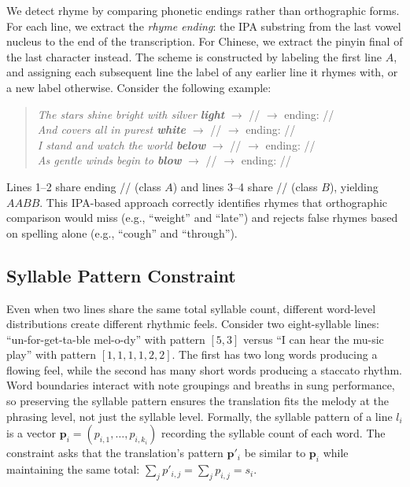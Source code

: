 \documentclass[11pt]{article}
\begin{document}
We detect rhyme by comparing phonetic endings rather than orthographic forms.
For each line, we extract the \emph{rhyme ending}: the IPA substring from the last vowel nucleus to the end of the transcription.
For Chinese, we extract the pinyin final of the last character instead.
The scheme is constructed by labeling the first line $A$, and assigning each subsequent line the label of any earlier line it rhymes with, or a new label otherwise.
Consider the following example:
\begin{quote}
\small
\emph{The stars shine bright with silver \textbf{light}} $\rightarrow$ // $\rightarrow$ ending: // \\
\emph{And covers all in purest \textbf{white}} $\rightarrow$ // $\rightarrow$ ending: // \\
\emph{I stand and watch the world \textbf{below}} $\rightarrow$ // $\rightarrow$ ending: // \\
\emph{As gentle winds begin to \textbf{blow}} $\rightarrow$ // $\rightarrow$ ending: //
\end{quote}
Lines 1--2 share ending // (class $A$) and lines 3--4 share // (class $B$), yielding $AABB$.
This IPA-based approach correctly identifies rhymes that orthographic comparison would miss (e.g., ``weight'' and ``late'') and rejects false rhymes based on spelling alone (e.g., ``cough'' and ``through'').

\subsection{Syllable Pattern Constraint}
\label{sec:syllable-pattern}

Even when two lines share the same total syllable count, different word-level distributions create different rhythmic feels.
Consider two eight-syllable lines: ``un-for-get-ta-ble mel-o-dy'' with pattern $[5, 3]$ versus ``I can hear the mu-sic play'' with pattern $[1, 1, 1, 1, 2, 2]$.
The first has two long words producing a flowing feel, while the second has many short words producing a staccato rhythm.
Word boundaries interact with note groupings and breaths in sung performance, so preserving the syllable pattern ensures the translation fits the melody at the phrasing level, not just the syllable level.
Formally, the syllable pattern of a line $l_i$ is a vector $\mathbf{p}_i = (p_{i,1}, \ldots, p_{i,k_i})$ recording the syllable count of each word. The constraint asks that the translation's pattern $\mathbf{p}'_i$ be similar to $\mathbf{p}_i$ while maintaining the same total: $\sum_j p'_{i,j} = \sum_j p_{i,j} = s_i$.
\end{document}
